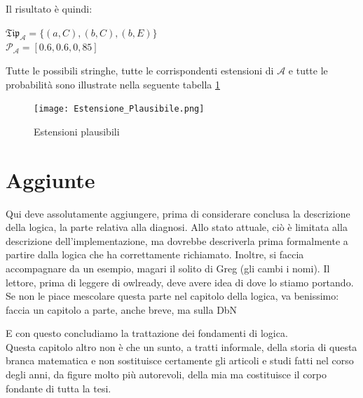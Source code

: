 Il risultato è quindi:
\begin{multicols}{2}
	$ \mathfrak{Tip}_{\mathcal{A}} = \{(a,C),(b,C),(b,E)\} $ \\
	$ \mathcal{P_{A}} = [0.6, 0.6, 0,85] $
\end{multicols}
Tutte le possibili stringhe, tutte le corrispondenti estensioni di $ \mathcal{A} $ e tutte le probabilità 
sono illustrate nella seguente tabella \ref{fig:estesioni}
\clearpage
\begin{figure}[t]
	\texttt{[image: Estensione\_Plausibile.png]}
	\caption{Estensioni plausibili}
	\label{fig:estesioni}
	\centering
\end{figure}

\section{Aggiunte}

Qui deve assolutamente aggiungere, prima di considerare conclusa la descrizione della logica, la parte relativa alla diagnosi. Allo stato attuale, ciò è limitata alla descrizione dell'implementazione, ma dovrebbe descriverla prima formalmente a partire dalla logica che ha correttamente richiamato. Inoltre, si faccia accompagnare da un esempio, magari il solito di Greg (gli cambi i nomi). Il lettore, prima di leggere di owlready, deve avere idea di dove lo stiamo portando. Se non le piace mescolare questa parte nel capitolo della logica, va benissimo: faccia un capitolo a parte, anche breve, ma sulla DbN

E con questo concludiamo la trattazione dei fondamenti di logica.\\ 
Questa capitolo altro non è che un sunto, a tratti informale, della storia di questa branca matematica  
e non sostituisce certamente gli articoli e studi fatti nel corso degli anni, da figure molto più autorevoli,
della mia ma costituisce il corpo fondante di tutta la tesi.




